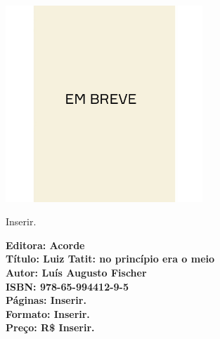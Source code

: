 \pagestyle{acorde}
\label{acorde}

\begin{center}
\hspace*{.5cm}\includegraphics[width=74mm]{./CAPAS/breve.jpeg}
\end{center}
\hspace*{-7cm}\hrulefill\hspace*{-7cm}
\medskip

\noindent{}Inserir.

\vfill
\hspace*{-.4cm}\begin{minipage}[c]{.5\linewidth}
\small\textbf{
\hspace*{-.1cm}Editora: Acorde\\
Título: Luiz Tatit: no princípio era o meio\\
Autor: Luís Augusto Fischer\\ 
ISBN: 978-65-994412-9-5\\
Páginas: Inserir.\\
Formato: Inserir.\\
Preço: R\$ Inserir.\\
}
\end{minipage}
\pagebreak

